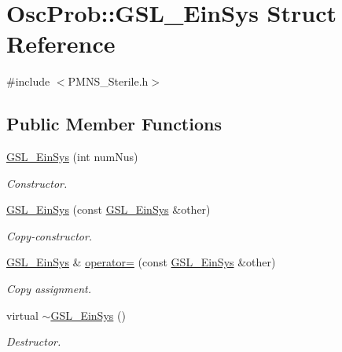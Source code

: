 \hypertarget{structOscProb_1_1GSL__EinSys}{}\section{Osc\+Prob\+:\+:G\+S\+L\+\_\+\+Ein\+Sys Struct Reference}
\label{structOscProb_1_1GSL__EinSys}


{\ttfamily \#include $<$P\+M\+N\+S\+\_\+\+Sterile.\+h$>$}

\subsection*{Public Member Functions}
\begin{DoxyCompactItemize}
\item 
\hyperlink{structOscProb_1_1GSL__EinSys_af6a40b1ed40d5d9b36a7a7bdf8aedc99}{G\+S\+L\+\_\+\+Ein\+Sys} (int num\+Nus)
\begin{DoxyCompactList}\small\item\em Constructor. \end{DoxyCompactList}\item 
\hyperlink{structOscProb_1_1GSL__EinSys_adec9051a3cee7956d84d230f371fa898}{G\+S\+L\+\_\+\+Ein\+Sys} (const \hyperlink{structOscProb_1_1GSL__EinSys}{G\+S\+L\+\_\+\+Ein\+Sys} \&other)
\begin{DoxyCompactList}\small\item\em Copy-\/constructor. \end{DoxyCompactList}\item 
\hyperlink{structOscProb_1_1GSL__EinSys}{G\+S\+L\+\_\+\+Ein\+Sys} \& \hyperlink{structOscProb_1_1GSL__EinSys_a17c804d4400c2cc4d32ff0438ed0284e}{operator=} (const \hyperlink{structOscProb_1_1GSL__EinSys}{G\+S\+L\+\_\+\+Ein\+Sys} \&other)
\begin{DoxyCompactList}\small\item\em Copy assignment. \end{DoxyCompactList}\item 
virtual \hyperlink{structOscProb_1_1GSL__EinSys_a62c08d2a6318e6b0abdd2ca6fd47622e}{$\sim$\+G\+S\+L\+\_\+\+Ein\+Sys} ()
\begin{DoxyCompactList}\small\item\em Destructor. \end{DoxyCompactList}\end{DoxyCompactItemize}
